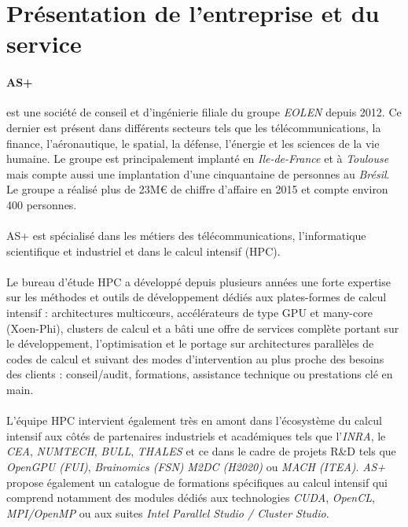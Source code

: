 \section{Présentation de l'entreprise et du service}
\paragraph{AS+}
est une société de conseil et d'ingénierie filiale du groupe \emph{EOLEN} depuis 2012. Ce dernier est présent dans différents secteurs tels que les télécommunications, la finance, l'aéronautique, le spatial, la défense, l'énergie et les sciences de la vie humaine. Le groupe est principalement implanté en \emph{Ile-de-France} et à \emph{Toulouse} mais compte aussi une implantation d'une cinquantaine de personnes au \emph{Brésil}. Le groupe a réalisé plus de 23M\euro{} de chiffre d'affaire en 2015 et compte environ 400 personnes.

\paragraph{}
AS+ est spécialisé dans les métiers des télécommunications, l'informatique scientifique et industriel et dans le calcul intensif (HPC).

\paragraph{}
Le bureau d’étude HPC a développé depuis plusieurs années une forte expertise sur les méthodes et outils de développement dédiés aux plates-formes de calcul intensif : architectures multic\oe{}urs, accélérateurs de type GPU et many-core (Xoen-Phi), clusters de calcul et a bâti une offre de services complète portant sur le développement, l’optimisation et le portage sur architectures parallèles de codes de calcul et suivant des modes d’intervention au plus proche des besoins des clients : conseil/audit, formations, assistance technique ou prestations clé en main.

\paragraph{}
L’équipe HPC intervient également très en amont dans l’écosystème du calcul intensif aux côtés de partenaires industriels et académiques tels que l’\emph{INRA}, le \emph{CEA}, \emph{NUMTECH}, \emph{BULL}, \emph{THALES} et ce dans le cadre de projets R\&D tels que \emph{OpenGPU (FUI)}, \emph{Brainomics (FSN)} \emph{M2DC (H2020)} ou \emph{MACH (ITEA)}. \emph{AS+} propose également un catalogue de formations spécifiques au calcul intensif qui comprend notamment des modules dédiés aux technologies \emph{CUDA}, \emph{OpenCL}, \emph{MPI/OpenMP} ou aux suites \emph{Intel Parallel Studio / Cluster Studio}.

